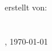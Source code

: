 \thispagestyle{plain}

\begin{titlepage}

	\begin{center}
	{}\\[35ex]
	
	{}\\[7ex]
	
	
	~\\[25ex]
	erstellt von:\\
	\personName\\
	
	~\\[10ex]
	\ort, \today
	
	\end{center}
\end{titlepage}